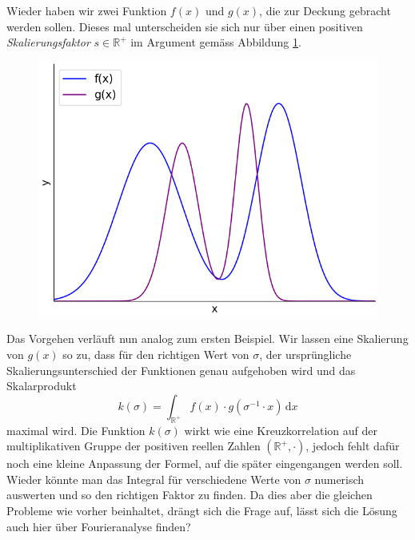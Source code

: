 Wieder haben wir zwei Funktion $f(x)$ und $g(x)$, die zur Deckung gebracht 
werden sollen. Dieses mal unterscheiden sie sich nur 
über einen positiven \emph{Skalierungsfaktor} $s \in \mathbb{R^+}$ im 
Argument gemäss Abbildung \ref{fig:mellin:f2}.
\begin{figure}
    \centering
    \includegraphics[width=.5\textwidth]{papers/mellin/images/f2}
    \caption{}
    \label{fig:mellin:f2}
\end{figure}
Das Vorgehen verläuft nun analog zum ersten Beispiel. Wir lassen eine 
Skalierung von $g(x)$ so zu, dass für den richtigen Wert von
$\sigma$, der ursprüngliche Skalierungsunterschied der Funktionen genau 
aufgehoben wird und das Skalarprodukt
\begin{equation}
    k(\sigma) 
    = \int_\mathbb{R^+} f(x) \cdot g(\sigma^{-1} \cdot x)\,\mathrm{d}x
    \label{mellin:ksigma}
\end{equation}
maximal wird.
Die Funktion $k(\sigma)$ wirkt wie eine Kreuzkorrelation auf der 
multiplikativen Gruppe der positiven reellen Zahlen $(\mathbb{R^+},\cdot)$, 
jedoch fehlt dafür noch eine kleine Anpassung der Formel, auf die später 
eingengangen werden soll. 
Wieder könnte man das Integral für verschiedene Werte von $\sigma$ 
numerisch auswerten und so den richtigen Faktor zu finden. 
Da dies aber die gleichen Probleme wie vorher beinhaltet, drängt sich die 
Frage auf, lässt sich die Lösung auch hier über Fourieranalyse finden?



